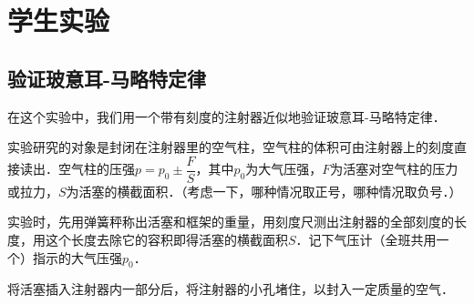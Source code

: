 \chapter{学生实验}

\section{验证玻意耳-马略特定律}

在这个实验中，我们用一个带有刻度的注射器近似地验证玻意耳-马略特定律．

实验研究的对象是封闭在注射器里的空气柱，空气柱的体积可由注射器上的刻度直接读出．空气柱的压强$p=p_0\pm \dfrac{F}{S}$，其中$p_0$为大气压强，$F$为活塞对空气柱的压力或拉力，$S$为活塞的横截面积．（考虑一下，哪种情况取正号，哪种情况取负号．）

实验时，先用弹簧秤称出活塞和框架的重量，用刻度尺测出注射器的全部刻度的长度，用这个长度去除它的容积即得活塞的横截面积$S$．记下气压计（全班共用一个）指示的大气压强$p_0$．

将活塞插入注射器内一部分后，将注射器的小孔堵住，以封入一定质量的空气．

